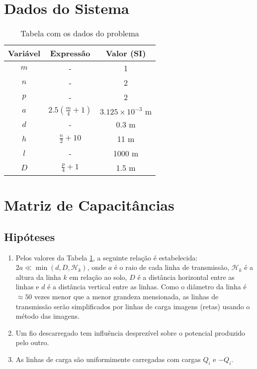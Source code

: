 \documentclass{aleph-revista}
\begin{document}
\membrete

\vspace{1em}

\section{Dados do Sistema}

\begin{table}[!h]
  \centering
  \caption{Tabela com os dados do problema}
  \label{tab:dados}
  \begin{tabular}{ccc}
    \toprule
    Variável & Expressão                                       &
    Valor (SI)                                                                                  \\
    \midrule
    $m$      & -                                               & 1                              \\
    $n$      & -                                               & 2                              \\
    $p$      & -                                               & 2                              \\
    $a$      & $\displaystyle 2.5\left( \frac{m}{4}+1 \right)$ & $3.125\times10^{-3} \text{ m}$ \\
    $d$      & -                                               & 0.3 m                          \\
    $h$      & $\displaystyle \frac{n}{2} + 10$                & 11 m                           \\
    $l$      & -                                               & 1000 m                         \\
    $D$      & $\displaystyle \frac{p}{4}+1$                   & 1.5 m                          \\
    \bottomrule
  \end{tabular}
\end{table}

\section{Matriz de Capacitâncias}
\subsection{Hipóteses}
\begin{enumerate}
  \item Pelos valores da Tabela \ref{tab:dados}, a seguinte relação é estabelecida: $2a \ll \min(d, D, \mathcal{H}_k)$, onde $a$ é o raio de cada linha de transmissão, $\mathcal{H}_k$ é a altura da linha $k$ em relação ao solo, $D$ é a distância horizontal entre as linhas e $d$ é a distância vertical entre as linhas. Como o diâmetro da linha é $\approx 50$ vezes menor que a menor grandeza mensionada, as linhas de transmissão serão simplificados por linhas de carga imagens (retas) usando o método das imagens.
  \item Um fio descarregado tem influência desprezível sobre o potencial produzido pelo outro.
  \item As linhas de carga são uniformimente carregadas com cargas $Q_i$ e $-Q_i$.
\end{enumerate}
\end{document}
